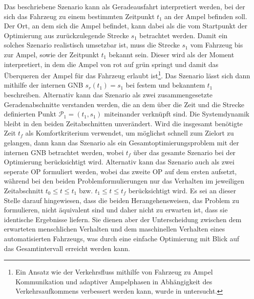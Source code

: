 Das beschriebene Szenario kann als Geradeausfahrt interpretiert werden, bei der sich das Fahrzeug zu einem bestimmten Zeitpunkt $t_1$ an der Ampel befinden soll. Der Ort, an dem sich die Ampel befindet, kann dabei als die vom Startpunkt der Optimierung aus zurückzulegende Strecke $s_1$ betrachtet werden. Damit ein solches Szenario realistisch umsetzbar ist, muss die Strecke $s_1$ vom Fahrzeug bis zur Ampel, sowie der Zeitpunkt $t_1$ bekannt sein. Dieser wird als der Moment interpretiert, in dem die Ampel von rot auf grün springt und damit das Überqueren der Ampel für das Fahrzeug erlaubt ist\footnote{Ein Ansatz wie der Verkehrsfluss mithilfe von Fahrzeug zu Ampel Kommunikation und adaptiver Ampelphasen in Abhängigkeit des Verkehrsaufkommens verbessert werden kann, wurde in \cite{Gradinescu} untersucht.}. Das Szenario lässt sich dann mithilfe der internen \gls{GNB} $s_r(t_1) = s_1$ bei festem und bekanntem $t_1$ beschreiben. Alternativ kann das Szenario als zwei zusammengesetzte Geradenabschnitte verstanden werden, die an dem über die Zeit und die Strecke definierten Punkt $\mathcal{P}_1 = (t_1, s_1)$ miteinander verknüpft sind. Die Systemdynamik bleibt in den beiden Zeitabschnitten unverändert. Wird die insgesamt benötigte Zeit $t_f$ als Komfortkriterium verwendet, um möglichst schnell zum Zielort zu gelangen, dann kann das Szenario als ein Gesamtoptimierungsproblem mit der internen \gls{GNB} betrachtet werden, wobei $t_f$ über das gesamte Szenario bei der Optimierung berücksichtigt wird. Alternativ kann das Szenario auch als zwei seperate \gls{OP} formuliert werden, wobei das zweite \gls{OP} auf dem ersten aufsetzt, während bei den beiden Problemformulierungen nur das Verhalten im jeweiligen Zeitabschnitt $t_0 \leq t \leq t_1$ bzw. $t_1 \leq t \leq t_f$ berücksichtigt wird. Es sei an dieser Stelle darauf hingewiesen, dass die beiden Herangehensweisen, das Problem zu formulieren, nicht äquivalent sind und daher nicht zu erwarten ist, dass sie identische Ergebnisse liefern. Sie dienen aber der Unterscheidung zwischen dem erwarteten menschlichen Verhalten und dem maschinellen Verhalten eines automatisierten Fahrzeugs, was durch eine einfache Optimierung mit Blick auf das Gesamtintervall erreicht werden kann.


